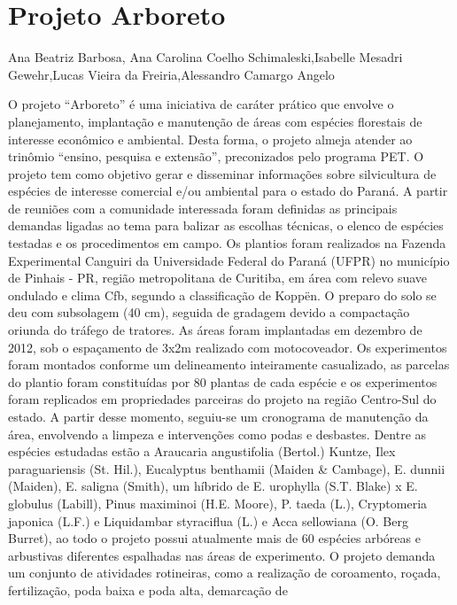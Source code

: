 

\section{Projeto Arboreto}

Ana Beatriz Barbosa, Ana Carolina Coelho Schimaleski,Isabelle Mesadri Gewehr,Lucas Vieira da Freiria,Alessandro Camargo Angelo

O projeto “Arboreto” é uma iniciativa de caráter prático que envolve o planejamento,
implantação e manutenção de áreas com espécies florestais de interesse econômico e ambiental.
Desta forma, o projeto almeja atender ao trinômio “ensino, pesquisa e extensão”, preconizados
pelo programa PET. O projeto tem como objetivo gerar e disseminar informações sobre
silvicultura de espécies de interesse comercial e/ou ambiental para o estado do Paraná. A partir
de reuniões com a comunidade interessada foram definidas as principais demandas ligadas ao
tema para balizar as escolhas técnicas, o elenco de espécies testadas e os procedimentos em
campo. Os plantios foram realizados na Fazenda Experimental Canguiri da Universidade Federal
do Paraná (UFPR) no município de Pinhais - PR, região metropolitana de Curitiba, em área com
relevo suave ondulado e clima Cfb, segundo a classificação de Koppën. O preparo do solo se deu
com subsolagem (40 cm), seguida de gradagem devido a compactação oriunda do tráfego de
tratores. As áreas foram implantadas em dezembro de 2012, sob o espaçamento de 3x2m
realizado com motocoveador. Os experimentos foram montados conforme um delineamento
inteiramente casualizado, as parcelas do plantio foram constituídas por 80 plantas de cada
espécie e os experimentos foram replicados em propriedades parceiras do projeto na região
Centro-Sul do estado. A partir desse momento, seguiu-se um cronograma de manutenção da
área, envolvendo a limpeza e intervenções como podas e desbastes. Dentre as espécies estudadas
estão a Araucaria angustifolia (Bertol.) Kuntze, Ilex paraguariensis (St. Hil.), Eucalyptus
benthamii (Maiden & Cambage), E. dunnii (Maiden), E. saligna (Smith), um híbrido de E.
urophylla (S.T. Blake) x E. globulus (Labill), Pinus maximinoi (H.E. Moore), P. taeda (L.),
Cryptomeria japonica (L.F.) e Liquidambar styraciflua (L.) e Acca sellowiana (O. Berg Burret),
ao todo o projeto possui atualmente mais de 60 espécies arbóreas e arbustivas diferentes
espalhadas nas áreas de experimento. O projeto demanda um conjunto de atividades rotineiras,
como a realização de coroamento, roçada, fertilização, poda baixa e poda alta, demarcação de
